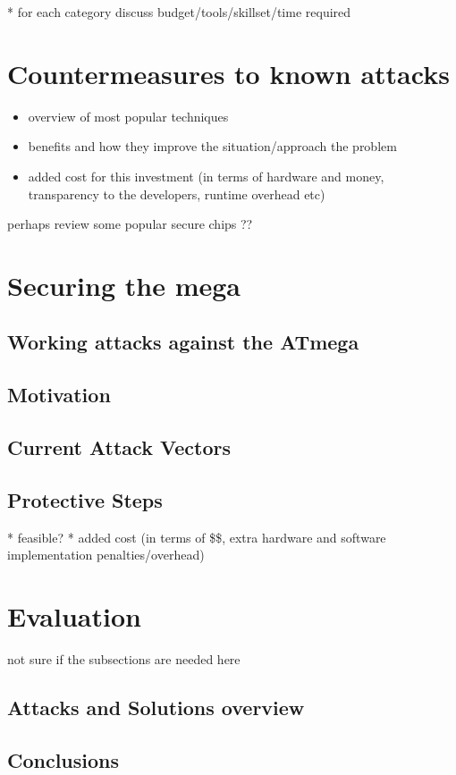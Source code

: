 \documentclass[12pt,a4paper,twocolumn]{article}
\begin{document}
	* for each category discuss budget/tools/skillset/time required\\

\section{Countermeasures to known attacks}
	\begin{itemize}
	\item overview of most popular techniques \\
	\item benefits and how they improve the situation/approach the problem
	\item added cost for this investment (in terms of hardware and money, transparency to the developers, runtime overhead etc)\\
	\end{itemize}
	
	perhaps review some popular secure chips ??	
	
	

\section{Securing the mega}
	\subsection{Working attacks against the ATmega}
	\subsection{Motivation}
	\subsection{Current Attack Vectors}
	\subsection{Protective Steps}
		* feasible? 
		* added cost (in terms of \$\$, extra hardware and software implementation penalties/overhead)
	

\section{Evaluation}
	not sure if the subsections are needed here
	\subsection{Attacks and Solutions overview}
	\subsection{Conclusions}
	
	\pagebreak
	\onecolumn
	
		
	
\end{document}
